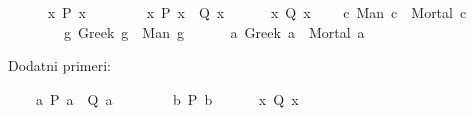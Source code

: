 %
\begin{isabellebody}%
%
%
\isadelimtheory
%
\endisadelimtheory
%
\isatagtheory
%
\endisatagtheory
{\isafoldtheory}%
%
\isadelimtheory
%
\endisadelimtheory
%
\begin{exercise}[subtitle=Isar dokazi u logici prvog reda.]
\isamarkupfalse%
\ \isanewline
\ \ \ {\isachardoublequoteopen}{\isacharparenleft}{\kern0pt}{\isasymexists}\ x{\isachardot}{\kern0pt}\ P\ x{\isacharparenright}{\kern0pt}{\isachardoublequoteclose}\isanewline
\ \ \ \ \ \ \ {\isachardoublequoteopen}{\isacharparenleft}{\kern0pt}{\isasymforall}\ x{\isachardot}{\kern0pt}\ P\ x\ {\isasymlongrightarrow}\ Q\ x{\isacharparenright}{\kern0pt}{\isachardoublequoteclose}\isanewline
\ \ \ \ \ {\isachardoublequoteopen}{\isacharparenleft}{\kern0pt}{\isasymexists}\ x{\isachardot}{\kern0pt}\ Q\ x{\isacharparenright}{\kern0pt}{\isachardoublequoteclose}%
\isadelimproof
%
\endisadelimproof
%
\isatagproof
%
\endisatagproof
{\isafoldproof}%
%
\isadelimproof
%
\endisadelimproof
\isanewline
{}\isamarkupfalse%
\isanewline
\ \ \ {\isachardoublequoteopen}{\isasymforall}\ c{\isachardot}{\kern0pt}\ Man\ c\ {\isasymlongrightarrow}\ Mortal\ c{\isachardoublequoteclose}\isanewline
\ \ \ \ \ \ \ {\isachardoublequoteopen}{\isasymforall}\ g{\isachardot}{\kern0pt}\ Greek\ g\ {\isasymlongrightarrow}\ Man\ g{\isachardoublequoteclose}\isanewline
\ \ \ \ \ {\isachardoublequoteopen}{\isasymforall}\ a{\isachardot}{\kern0pt}\ Greek\ a\ {\isasymlongrightarrow}\ Mortal\ a{\isachardoublequoteclose}%
\isadelimproof
%
\endisadelimproof
%
\isatagproof
%
\endisatagproof
{\isafoldproof}%
%
\isadelimproof
%
\endisadelimproof
%
\begin{isamarkuptext}%
Dodatni primeri:%
\end{isamarkuptext}\isamarkuptrue%
\isamarkupfalse%
\isanewline
\ \ \ {\isachardoublequoteopen}{\isasymforall}\ a{\isachardot}{\kern0pt}\ P\ a\ {\isasymlongrightarrow}\ Q\ a{\isachardoublequoteclose}\isanewline
\ \ \ \ \ \ \ {\isachardoublequoteopen}{\isasymforall}\ b{\isachardot}{\kern0pt}\ P\ b{\isachardoublequoteclose}\isanewline
\ \ \ \ \ {\isachardoublequoteopen}{\isasymforall}\ x{\isachardot}{\kern0pt}\ Q\ x{\isachardoublequoteclose}%
\isadelimproof
%
\endisadelimproof
%
\isatagproof
%
\endisatagproof
{\isafoldproof}%
%
\isadelimproof
%
\endisadelimproof
\isanewline
{}\isamarkupfalse%

\end{exercise}
\end{isabellebody}
